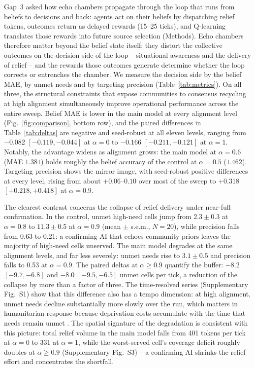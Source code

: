 \documentclass[pdflatex,sn-nature]{sn-jnl}
\begin{document}
Gap~3 asked how echo chambers propagate through the loop that runs from beliefs to decisions and back: agents act on their beliefs by dispatching relief tokens, outcomes return as delayed rewards (15--25 ticks), and Q-learning translates those rewards into future source selection (Methods). Echo chambers therefore matter beyond the belief state itself: they distort the collective outcomes on the decision side of the loop -- situational awareness and the delivery of relief -- and the rewards those outcomes generate determine whether the loop corrects or entrenches the chamber. We measure the decision side by the belief MAE, by unmet needs and by targeting precision (Table~\ref{tab:metrics}). On all three, the structural constraints that expose communities to consensus recycling at high alignment simultaneously improve operational performance across the entire sweep. Belief MAE is lower in the main model at every alignment level (Fig.~\ref{fig:comparison}, bottom row), and the paired differences in Table~\ref{tab:deltas} are negative and seed-robust at all eleven levels, ranging from $-0.082$ $[-0.119, -0.044]$ at $\alpha = 0$ to $-0.166$ $[-0.211, -0.121]$ at $\alpha = 1$. Notably, the advantage widens as alignment grows: the main model at $\alpha = 0.6$ (MAE $1.381$) holds roughly the belief accuracy of the control at $\alpha = 0.5$ ($1.462$). Targeting precision shows the mirror image, with seed-robust positive differences at every level, rising from about $+0.06$--$0.10$ over most of the sweep to $+0.318$ $[+0.218, +0.418]$ at $\alpha = 0.9$.

The clearest contrast concerns the collapse of relief delivery under near-full confirmation. In the control, unmet high-need cells jump from $2.3 \pm 0.3$ at $\alpha = 0.8$ to $11.3 \pm 0.5$ at $\alpha = 0.9$ (mean $\pm$ s.e.m., $N = 20$), while precision falls from 0.63 to 0.21: a confirming AI that echoes community priors leaves the majority of high-need cells unserved. The main model degrades at the same alignment levels, and far less severely: unmet needs rise to $3.1 \pm 0.5$ and precision falls to 0.53 at $\alpha = 0.9$. The paired deltas at $\alpha \geq 0.9$ quantify the buffer: $-8.2$ $[-9.7, -6.8]$ and $-8.0$ $[-9.5, -6.5]$ unmet cells per tick, a reduction of the collapse by more than a factor of three. The time-resolved series (Supplementary Fig.~S1) show that this difference also has a tempo dimension: at high alignment, unmet needs decline substantially more slowly over the run, which matters in humanitarian response because deprivation costs accumulate with the time that needs remain unmet \citep{holguin2012unique}. The spatial signature of the degradation is consistent with this picture: total relief volume in the main model falls from 401 tokens per tick at $\alpha = 0$ to 331 at $\alpha = 1$, while the worst-served cell's coverage deficit roughly doubles at $\alpha \geq 0.9$ (Supplementary Fig.~S3) -- a confirming AI shrinks the relief effort and concentrates the shortfall.
\end{document}
